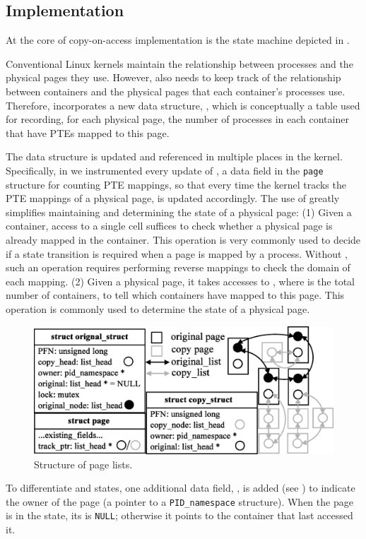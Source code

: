 \subsection{Implementation}
\label{cachebar:sec:coa:impl}

At the core of copy-on-access implementation is the state machine depicted in
.

\bheading{\unmapped $\Leftrightarrow$ \exclusive
  $\Leftrightarrow$ \shared}
Conventional Linux kernels maintain the relationship between processes
and the physical pages they use.  However, \cachebar also needs to keep
track of the relationship between containers and the physical pages
that each container's processes use.  Therefore, \cachebar incorporates
a new data structure, \pcounterincontainer, which is conceptually a
table used for recording, for each physical page, the number of
processes in each container that have \glspl{PTE} mapped
to this page. 

The \pcounterincontainer data structure is updated and referenced in
multiple places in the kernel.  Specifically, in \cachebar we
instrumented every update of \mapcount, a data field in the
\texttt{page} structure for counting \gls{PTE} mappings, so that every time
the kernel tracks the \gls{PTE} mappings of a physical page,
\pcounterincontainer is updated accordingly. The use of
\pcounterincontainer greatly simplifies maintaining and determining
the state of a physical page: (1) Given a container, access to a
single cell suffices to check whether a physical page is already
mapped in the container. This operation is very commonly used to
decide if a state transition is required when a page is mapped by a
process.  Without \pcounterincontainer, such an operation requires
performing reverse mappings to check the domain of each mapping. (2)
Given a physical page, it takes \containerNmbr accesses to
\pcounterincontainer, where \containerNmbr is the total number of
containers, to tell which containers have mapped to this
page. This operation is commonly used to determine the state of a
physical page.

\bheading{\shared $\Rightarrow$ \accessed}
\begin{figure}[tb]
\centering
\includegraphics[width=0.7\linewidth]{fig/cachebar/coa_struct.eps}
\caption{Structure of \coa page lists.}
\label{fig:linkedlist}
\end{figure} 
To differentiate \shared and \accessed states, one additional data field,
\owner, is added (see ) to indicate the owner of the page
(a pointer to a \texttt{PID\_namespace} structure). When the page is in the
\shared state, its \owner is \texttt{NULL}; otherwise it points to the
container that last accessed it.

